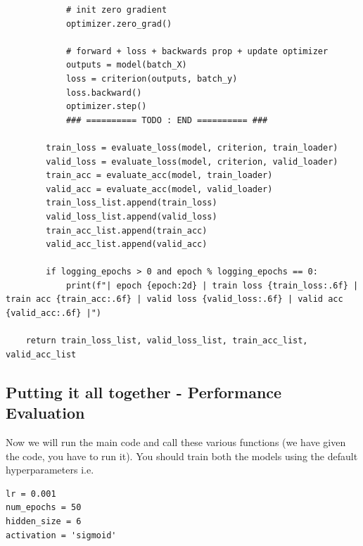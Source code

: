 \begin{enumerate}
\begin{verbatim}
            # init zero gradient
            optimizer.zero_grad()

            # forward + loss + backwards prop + update optimizer
            outputs = model(batch_X)
            loss = criterion(outputs, batch_y)
            loss.backward()
            optimizer.step()
            ### ========== TODO : END ========== ###
            
        train_loss = evaluate_loss(model, criterion, train_loader)
        valid_loss = evaluate_loss(model, criterion, valid_loader)
        train_acc = evaluate_acc(model, train_loader)
        valid_acc = evaluate_acc(model, valid_loader)
        train_loss_list.append(train_loss)
        valid_loss_list.append(valid_loss)
        train_acc_list.append(train_acc)
        valid_acc_list.append(valid_acc)

        if logging_epochs > 0 and epoch % logging_epochs == 0:
            print(f"| epoch {epoch:2d} | train loss {train_loss:.6f} | train acc {train_acc:.6f} | valid loss {valid_loss:.6f} | valid acc {valid_acc:.6f} |")

    return train_loss_list, valid_loss_list, train_acc_list, valid_acc_list
\end{verbatim}

\end{enumerate}

\subsection{Putting it all together - Performance Evaluation }

Now we will run the main code and call these various functions (we have given the code, you have to run it). You should train both the models using the default hyperparameters i.e.

\begin{verbatim}
lr = 0.001
num_epochs = 50
hidden_size = 6
activation = 'sigmoid'
\end{verbatim}

